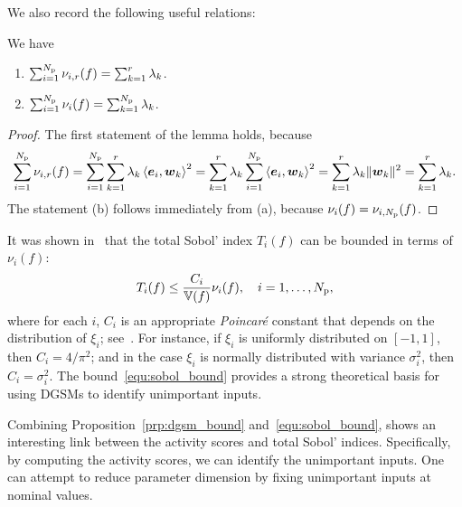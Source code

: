 We also record the following useful relations:
\begin{lemma}\label{lem:sum}
We have
\begin{enumerate}[label=(\alph*)]
\item $\sum_{i = 1}^\Np \act{f}{i}{r} = \sum_{k = 1}^r \lambda_k$. 
\item $\sum_{i = 1}^\Np \nu_i(f) = \sum_{k = 1}^\Np \lambda_k$. 
\end{enumerate}
\end{lemma}
\begin{proof}
The first statement of the lemma holds, because
\[
\sum_{i=1}^\Np \act{f}{i}{r}    
= \sum_{i=1}^\Np \sum_{k=1}^r \lambda_k \ip{\vec{e}_i}{\vec{w}_k}^2 
= \sum_{k=1}^r \lambda_k \sum_{i=1}^\Np \ip{\vec{e}_i}{\vec{w}_k}^2 
= \sum_{k=1}^r \lambda_k \| \vec{w}_k \|^2 = \sum_{k=1}^r \lambda_k.
\]
The statement (b) follows immediately from (a), because $\nu_i(f) = \act{f}{i}{\Np}$.
\end{proof}

It was shown in~\cite{Lamboni:2013} that the total Sobol' 
index $T_i(f)$ can be bounded in terms of $\nu_i(f)$:
\begin{equation}\label{equ:sobol_bound}
T_i(f) \leq \frac{C_i}{\V(f)}\nu_i(f), \quad i = 1, \ldots, \Np,
\end{equation}
where for each $i$, $C_i$ is an appropriate \emph{Poincar\'{e}} constant
that depends on the distribution of $\xi_i$; see~\cite{Lamboni:2013}.
For instance, if $\xi_i$ is uniformly distributed on $[-1, 1]$, then $C_i = 4/\pi^2$; and in the 
case $\xi_i$ is normally distributed with variance $\sigma_i^2$, then $C_i = \sigma_i^2$. 
The bound~\eqref{equ:sobol_bound} provides a strong theoretical basis for using DGSMs to identify 
unimportant inputs. 

Combining Proposition~\ref{prp:dgsm_bound} and~\eqref{equ:sobol_bound}, shows
an interesting link between the activity scores and total Sobol' indices.
Specifically, by computing the activity scores, we can identify the unimportant
inputs.  
One can attempt to reduce parameter dimension by fixing
unimportant inputs at nominal values. 

